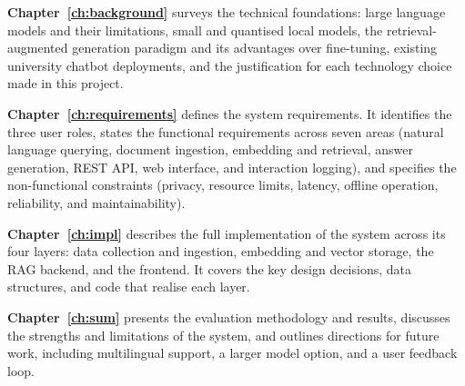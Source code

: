 \textbf{Chapter~\ref{ch:background}} surveys the technical foundations: large language models and their limitations, small and quantised local models, the retrieval-augmented generation paradigm and its advantages over fine-tuning, existing university chatbot deployments, and the justification for each technology choice made in this project.

\textbf{Chapter~\ref{ch:requirements}} defines the system requirements. It identifies the three user roles, states the functional requirements across seven areas (natural language querying, document ingestion, embedding and retrieval, answer generation, REST API, web interface, and interaction logging), and specifies the non-functional constraints (privacy, resource limits, latency, offline operation, reliability, and maintainability).

\textbf{Chapter~\ref{ch:impl}} describes the full implementation of the system across its four layers: data collection and ingestion, embedding and vector storage, the RAG backend, and the frontend. It covers the key design decisions, data structures, and code that realise each layer.

\textbf{Chapter~\ref{ch:sum}} presents the evaluation methodology and results, discusses the strengths and limitations of the system, and outlines directions for future work, including multilingual support, a larger model option, and a user feedback loop.
